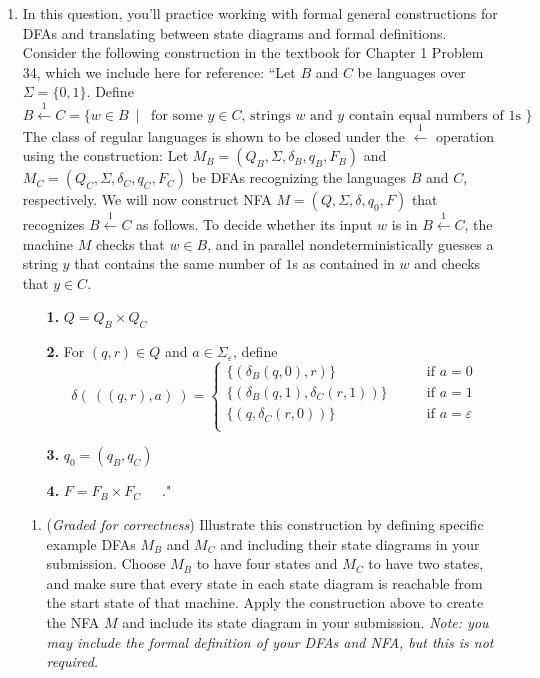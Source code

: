 \begin{enumerate}
\item In this question, you'll practice working with formal general constructions
for DFAs and translating between state diagrams and formal definitions.
Consider the following
construction in the 
textbook for Chapter 1 Problem 34, which we include here for reference: 
``Let $B$ and $C$ be languages over $\Sigma = \{ 0,1\}$. Define
\[
B \overset{1}{\leftarrow} C= \{ w \in B ~\mid~\textrm{ for some $y \in C$, strings $w$ and $y$ contain equal 
numbers of $1$s }\}
\]
The class of regular languages is shown to be closed under the $\overset{1}{\leftarrow}$ operation
using the construction: Let $M_B = (Q_B, \Sigma, \delta_B, q_B, F_B)$ and $M_C = ( Q_C, \Sigma, \delta_C, q_C, F_C)$ be DFAs recognizing the languages $B$ and $C$, respectively.  We will now construct NFA
$M = (Q, \Sigma, \delta, q_0, F)$ that recognizes $B \overset{1}{\leftarrow} C$ as follows.  To decide
whether its input $w$ is in $B \overset{1}{\leftarrow} C$, the machine $M$ checks that $w \in B$, and 
in parallel nondeterministically guesses a string $y$ that contains the same number of $1$s as 
contained in $w$ and checks that $y \in C$.
\begin{itemize}
\item[{\bf 1.}] $Q = Q_B \times Q_C$
\item[{\bf 2.}] For $(q,r) \in Q$ and $a \in \Sigma_\varepsilon$, define
\[
\delta( ~((q,r), a)~) = \begin{cases}
\{ (\delta_B(q,0) , r ) \}  \qquad&\textrm{if } a = 0 \\
\{ (\delta_B( q,1) ,  \delta_C( r,1) ) \}  \qquad&\textrm{if } a = 1 \\
\{ (q, \delta_C( r,0 ))\}  \qquad&\textrm{if } a = \varepsilon\\
\end{cases}
\]
\item[{\bf 3.}] $q_0 = (q_B, q_C)$
\item[{\bf 4.}] $F = F_B \times F_C$~~~."
\end{itemize}

\begin{enumerate}
\item ({\it Graded for correctness}) Illustrate this construction by defining specific example DFAs $M_B$ and $M_C$ and including 
their state diagrams in your submission.   Choose $M_B$ to have four states and $M_C$
to have two states, and make sure that every state in each state diagram is reachable from the start state
of that machine.
Apply the construction above to create the NFA $M$  and include its state diagram in your submission.
{\it Note: you may 
 include the formal definition of your DFAs and NFA, but this is not required.} 


\end{enumerate}
\end{enumerate}
